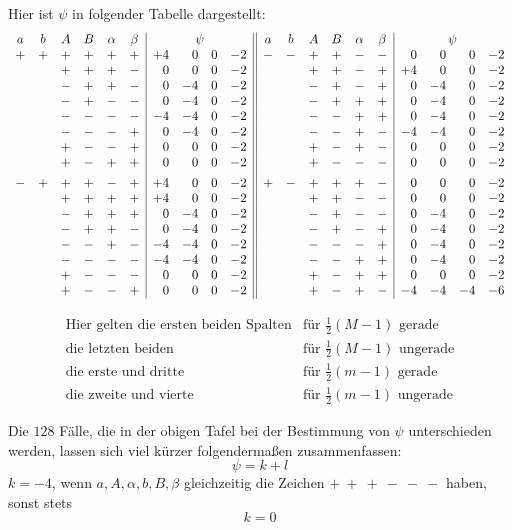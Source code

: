Hier ist $\psi$ in folgender Tabelle dargestellt:
\begingroup\small\setlength{\arraycolsep}{1.8pt}
\[
\begin{array}{cccccc|rrrr||cccccc|rrrr}
a&b&A&B&\alpha&\beta&\multicolumn{4}{c||}{\psi}&a&b&A&B&\alpha&\beta&\multicolumn{4}{c}{\psi}\\
+&+&+&+&+&+&+4&0&0&-2&-&-&+&+&-&-&0&0&0&-2\\
&&+&+&+&-&0&0&0&-2&&&+&+&-&+&+4&0&0&-2\\
&&-&+&+&-&0&-4&0&-2&&&-&+&-&+&0&-4&0&-2\\
&&-&+&-&-&0&-4&0&-2&&&-&+&+&+&0&-4&0&-2\\
&&-&-&-&-&-4&-4&0&-2&&&-&-&+&+&0&-4&0&-2\\
&&-&-&-&+&0&-4&0&-2&&&-&-&+&-&-4&-4&0&-2\\
&&+&-&-&+&0&0&0&-2&&&+&-&+&-&0&0&0&-2\\
&&+&-&+&+&0&0&0&-2&&&+&-&-&-&0&0&0&-2\\[4pt]
-&+&+&+&-&+&+4&0&0&-2&+&-&+&+&+&-&0&0&0&-2\\
&&+&+&+&+&+4&0&0&-2&&&+&+&-&-&0&0&0&-2\\
&&-&+&+&+&0&-4&0&-2&&&-&+&-&-&0&-4&0&-2\\
&&-&+&+&-&0&-4&0&-2&&&-&+&-&+&0&-4&0&-2\\
&&-&-&+&-&-4&-4&0&-2&&&-&-&-&+&0&-4&0&-2\\
&&-&-&-&-&-4&-4&0&-2&&&-&-&+&+&0&-4&0&-2\\
&&+&-&-&-&0&0&0&-2&&&+&-&+&+&0&0&0&-2\\
&&+&-&-&+&0&0&0&-2&&&+&-&+&-&-4&-4&-4&-6\\
\end{array}
\]
\endgroup

\[
\begin{array}{lll}
\text{Hier gelten die ersten beiden Spalten}&\text{für }\frac12(M-1)\text{ gerade}\\
\text{die letzten beiden}&\text{für }\frac12(M-1)\text{ ungerade}\\
\text{die erste und dritte}&\text{für }\frac12(m-1)\text{ gerade}\\
\text{die zweite und vierte}&\text{für }\frac12(m-1)\text{ ungerade}
\end{array}
\]

\clearpage
{}
Die $128$ Fälle, die in der obigen Tafel bei der Bestimmung von $\psi$ unterschieden werden, lassen sich viel kürzer folgendermaßen zusammenfassen:
\[
\psi=k+l
\]
$k=-4$, wenn $a,A,\alpha,b,B,\beta$ gleichzeitig die Zeichen $+\ +\ +\ -\ -\ -$ haben, sonst stets
\[
k=0
\]

